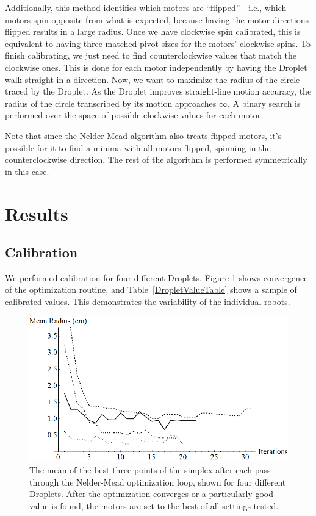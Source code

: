\documentclass[letterpaper, 10pt, conference]{ieeeconf}
\begin{document}
Additionally, this method identifies which motors are ``flipped''---i.e., which motors spin opposite from what is expected, because having the motor directions flipped results in a large radius. Once we have clockwise spin calibrated, this is equivalent to having three matched pivot sizes for the motors' clockwise spins. To finish calibrating, we just need to find counterclockwise values that match the clockwise ones. This is done for each motor independently by having the Droplet walk straight in a direction. Now, we want to maximize the radius of  the circle traced by the Droplet. As the Droplet improves straight-line motion accuracy, the radius of the circle transcribed by its motion approaches $\infty$. A binary search is performed over the space of possible clockwise values for each motor.

Note that since the Nelder-Mead algorithm also treats flipped motors, it's possible for it to find a minima with all motors flipped, spinning in the counterclockwise direction. The rest of the algorithm is performed symmetrically in this case.

\section{Results}

\subsection{Calibration}
We performed calibration for four different Droplets. Figure \ref{fig:radiiConverging} shows convergence of the optimization routine, and Table~\ref{DropletValueTable} shows a sample of calibrated values. This demonstrates the variability of the individual robots.

\begin{figure}[!htb]
\centering
\includegraphics[width=\linewidth]{Images/radiiConverging.png}
\caption{The mean of the best three points of the simplex after each pass through the Nelder-Mead optimization loop, shown for four different Droplets. After the optimization converges or a particularly good value is found, the motors are set to the best of all settings tested.}
\label{fig:radiiConverging}
\end{figure}
\end{document}
